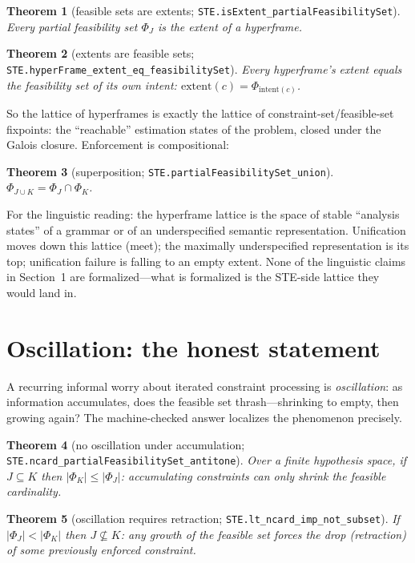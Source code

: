 \documentclass[11pt]{article}
\newtheorem{theorem}{Theorem}
\newcommand{\lean}[1]{\texttt{#1}}
\begin{document}
\begin{theorem}[feasible sets are extents;
\lean{STE.isExtent\_partialFeasibilitySet}]
Every partial feasibility set $\Phi_J$ is the extent of a hyperframe.
\end{theorem}

\begin{theorem}[extents are feasible sets;
\lean{STE.hyperFrame\_extent\_eq\_feasibilitySet}]
Every hyperframe's extent equals the feasibility set of its own
intent: $\mathrm{extent}(c) = \Phi_{\mathrm{intent}(c)}$.
\end{theorem}

So the lattice of hyperframes is exactly the lattice of
constraint-set/feasible-set fixpoints: the ``reachable'' estimation
states of the problem, closed under the Galois closure.  Enforcement is
compositional:

\begin{theorem}[superposition; \lean{STE.partialFeasibilitySet\_union}]
$\Phi_{J \cup K} = \Phi_J \cap \Phi_K$.
\end{theorem}

For the linguistic reading: the hyperframe lattice is the space of
stable ``analysis states'' of a grammar or of an underspecified
semantic representation.  Unification moves down this lattice (meet);
the maximally underspecified representation is its top; unification
failure is falling to an empty extent.  None of the linguistic claims
in Section~1 are formalized---what is formalized is the STE-side
lattice they would land in.

\section{Oscillation: the honest statement}
\label{sec:oscillation}

A recurring informal worry about iterated constraint processing is
\emph{oscillation}: as information accumulates, does the feasible set
thrash---shrinking to empty, then growing again?  The machine-checked
answer localizes the phenomenon precisely.

\begin{theorem}[no oscillation under accumulation;
\lean{STE.ncard\_partialFeasibilitySet\_antitone}]
Over a finite hypothesis space, if $J \subseteq K$ then
$|\Phi_K| \le |\Phi_J|$: accumulating constraints can only shrink the
feasible cardinality.
\end{theorem}

\begin{theorem}[oscillation requires retraction;
\lean{STE.lt\_ncard\_imp\_not\_subset}]
If $|\Phi_J| < |\Phi_K|$ then $J \not\subseteq K$: any growth of the
feasible set forces the drop (retraction) of some previously enforced
constraint.
\end{theorem}
\end{document}

